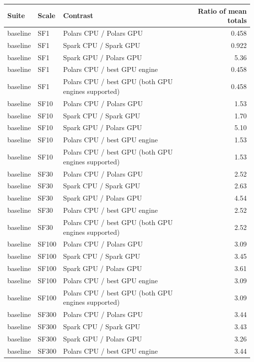 \begin{tabular}{lllr}
\toprule
Suite & Scale & Contrast & Ratio of mean totals \\
\midrule
baseline & SF1 & Polars CPU / Polars GPU & 0.458 \\
baseline & SF1 & Spark CPU / Spark GPU & 0.922 \\
baseline & SF1 & Spark GPU / Polars GPU & 5.36 \\
baseline & SF1 & Polars CPU / best GPU engine & 0.458 \\
baseline & SF1 & Polars CPU / best GPU (both GPU engines supported) & 0.458 \\
baseline & SF10 & Polars CPU / Polars GPU & 1.53 \\
baseline & SF10 & Spark CPU / Spark GPU & 1.70 \\
baseline & SF10 & Spark GPU / Polars GPU & 5.10 \\
baseline & SF10 & Polars CPU / best GPU engine & 1.53 \\
baseline & SF10 & Polars CPU / best GPU (both GPU engines supported) & 1.53 \\
baseline & SF30 & Polars CPU / Polars GPU & 2.52 \\
baseline & SF30 & Spark CPU / Spark GPU & 2.63 \\
baseline & SF30 & Spark GPU / Polars GPU & 4.54 \\
baseline & SF30 & Polars CPU / best GPU engine & 2.52 \\
baseline & SF30 & Polars CPU / best GPU (both GPU engines supported) & 2.52 \\
baseline & SF100 & Polars CPU / Polars GPU & 3.09 \\
baseline & SF100 & Spark CPU / Spark GPU & 3.45 \\
baseline & SF100 & Spark GPU / Polars GPU & 3.61 \\
baseline & SF100 & Polars CPU / best GPU engine & 3.09 \\
baseline & SF100 & Polars CPU / best GPU (both GPU engines supported) & 3.09 \\
baseline & SF300 & Polars CPU / Polars GPU & 3.44 \\
baseline & SF300 & Spark CPU / Spark GPU & 3.43 \\
baseline & SF300 & Spark GPU / Polars GPU & 3.26 \\
baseline & SF300 & Polars CPU / best GPU engine & 3.44 \\

\end{tabular}
